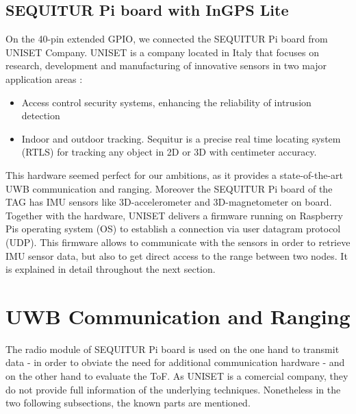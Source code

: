 \subsection{SEQUITUR Pi board with InGPS Lite}
On the 40-pin extended GPIO, we connected the SEQUITUR Pi board from UNISET Company. UNISET is a company located in Italy that focuses on research, development and manufacturing of innovative sensors in two major application areas \cite{Uniset}:

\begin{itemize}
\item Access control security systems, enhancing the reliability of intrusion detection
\item Indoor and outdoor tracking. Sequitur is a precise real time locating system (RTLS) for tracking any object in 2D or 3D with centimeter accuracy.
\end{itemize}

This hardware seemed perfect for our ambitions, as it provides a state-of-the-art UWB communication and ranging. Moreover the SEQUITUR Pi board of the TAG has IMU sensors like 3D-accelerometer and 3D-magnetometer on board. Together with the hardware, UNISET delivers a firmware running on Raspberry Pis operating system (OS) to establish a connection via user datagram protocol (UDP). This firmware allows to communicate with the sensors in order to retrieve IMU sensor data, but also to get direct access to the range between two nodes. It is explained in detail throughout the next section. 


\section{UWB Communication and Ranging}
The radio module of SEQUITUR Pi board is used on the one hand to transmit data - in order to obviate the need for additional communication hardware - and on the other hand to evaluate the ToF. As UNISET is a comercial company, they do not provide full information of the underlying techniques. Nonetheless in the two following subsections, the known parts are mentioned.

